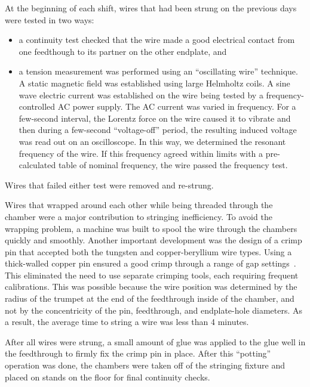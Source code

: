 At the beginning of each shift, wires that had been strung on the previous days
were tested in two ways:
\begin{itemize}
\item a continuity test checked that the wire made a good electrical contact
from one feedthough to its partner on the other endplate, and
\item a tension measurement was performed using an ``oscillating wire'' technique.
A static magnetic field was established using large Helmholtz coils.  A sine
wave electric current was established on the wire being tested by a frequency-controlled 
AC power supply.  The AC current was varied in frequency.  For a 
few-second interval, the Lorentz force on the wire caused it to vibrate and
then during a few-second ``voltage-off'' period, the resulting induced voltage
was read out on an oscilloscope.  In this way, we determined the resonant frequency
of the wire.  If this frequency agreed within limits with a pre-calculated
table of nominal frequency, the wire passed the frequency test.
\end{itemize}
Wires that failed either test were removed and re-strung.

Wires that wrapped around each other while being threaded through the chamber 
were a major contribution to stringing inefficiency. To avoid the wrapping
problem, a machine was built to spool the wire through the chambers quickly and smoothly.
Another important development was the design of a crimp pin 
that accepted both the tungsten and copper-beryllium wire types.  Using a 
thick-walled 
copper pin ensured a good crimp through a range of gap settings~\cite{sbc}.  This 
eliminated the need to use separate crimping tools, each requiring frequent 
calibrations.  This was possible because the wire position was determined by the 
radius of the trumpet at the end of the feedthrough inside of the chamber, and 
not by the concentricity of the pin, feedthrough, and endplate-hole diameters. 
As a result, the average time to string a wire was less than 4 minutes.

After all wires were strung,
a small amount of glue was applied to the glue well
in the feedthrough to firmly fix the crimp pin in place.  After this ``potting''
operation was done, the chambers were taken off of the stringing fixture and
placed on stands on the floor for final continuity checks.








